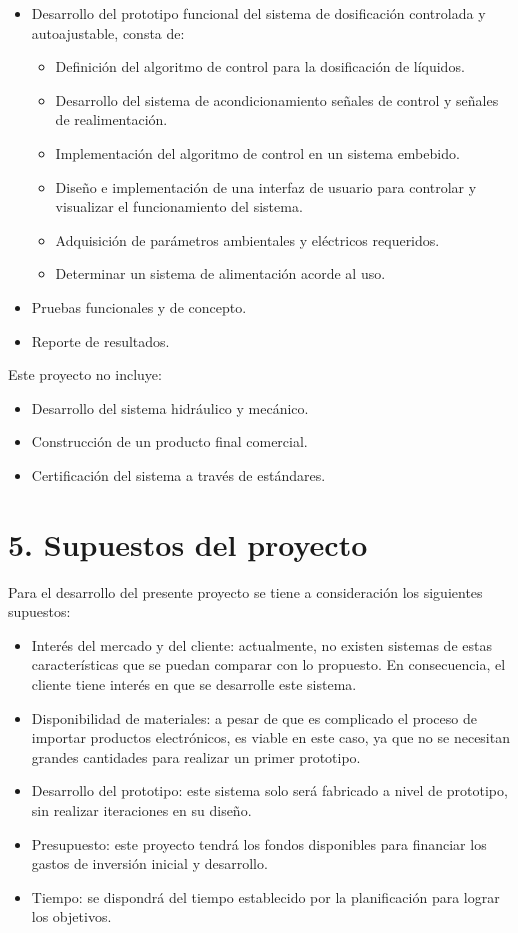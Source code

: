 \documentclass[
11pt, %
]{charter}
\begin{document}
\begin{itemize}
	\item Desarrollo del prototipo funcional del sistema de dosificación controlada y autoajustable, consta de:
			\begin{itemize}
	\item Definición del algoritmo de control para la dosificación de líquidos.
	\item Desarrollo del sistema de acondicionamiento señales de control y señales de realimentación.
	\item Implementación del algoritmo de control en un sistema embebido.
	\item Diseño e implementación de una interfaz de usuario para controlar y visualizar el funcionamiento del sistema.
	\item Adquisición de parámetros ambientales y eléctricos requeridos.
	\item Determinar un sistema de alimentación acorde al uso.
			\end{itemize}
	\item Pruebas funcionales y de concepto.
	\item Reporte de resultados.
\end{itemize}

Este proyecto no incluye:

\begin{itemize}
	\item Desarrollo del sistema hidráulico y mecánico.
	\item Construcción de un producto final comercial.
	\item Certificación del sistema a través de estándares.
\end{itemize}


\section{5. Supuestos del proyecto}
\label{sec:supuestos}

Para el desarrollo del presente proyecto se tiene a consideración los siguientes supuestos:

\begin{itemize}
	\item Interés del mercado y del cliente: actualmente, no existen sistemas de estas características que se puedan comparar con lo propuesto. En consecuencia, el cliente tiene interés en que se desarrolle este sistema.
	\item Disponibilidad de materiales: a pesar de que es complicado el proceso de importar productos electrónicos, es viable en este caso, ya que no se necesitan grandes cantidades para realizar un primer prototipo.
	\item Desarrollo del prototipo: este sistema solo será fabricado a nivel de prototipo, sin realizar iteraciones en su diseño.
	\item Presupuesto: este proyecto tendrá los fondos disponibles para financiar los gastos de inversión inicial y desarrollo.
	\item Tiempo: se dispondrá del tiempo establecido por la planificación para lograr los objetivos.
\end{itemize}
\end{document}
